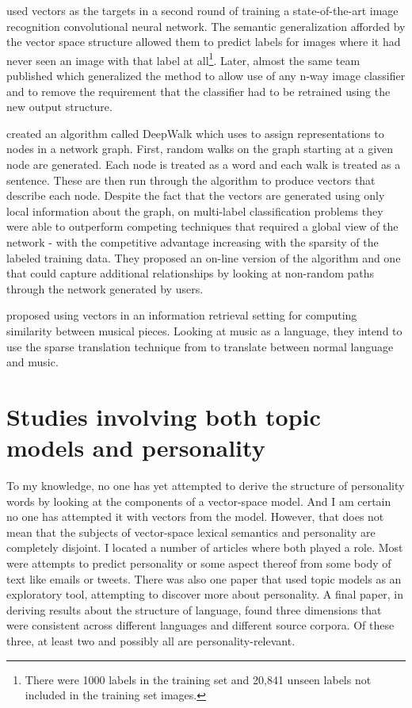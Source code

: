 \citep{Frome2013} used \modelname{} vectors as the targets in a second round
of training a state-of-the-art image recognition convolutional neural network.
The semantic generalization afforded by the vector space structure allowed them
to predict labels for images where it had never seen an image with that label
at all\footnote{There were 1000 labels in the training set and 20,841 unseen 
labels not included in the training set images.}. Later, almost the same team 
published \citep{Norouzi2013} which 
generalized the method to allow use of any n-way image classifier and to 
remove the requirement that the classifier had to be retrained using the 
new output structure. 

\citep{Perozzi2014} created an algorithm called DeepWalk which uses
\modelname{} to assign representations to nodes in a network graph. First, 
random walks on the graph starting at a given node are generated. Each node is
treated as a word and each walk is treated as a sentence. These are then run
through the \modelname{} algorithm to produce vectors that describe each node.
Despite the fact that the vectors are generated using only local information
about the graph, on multi-label classification problems they were able to 
outperform competing techniques that required
a global view of the network - with the competitive advantage increasing with 
the sparsity of the labeled training data. They proposed an on-line version of
the algorithm and one that could capture additional relationships by looking at
non-random paths through the network generated by users.


\citep{Osendorfer2013} proposed using \modelname{} vectors in an information
retrieval setting for computing similarity between musical pieces. Looking at 
music as a language, they intend to use the sparse translation technique from
\citep{Mikolov2013a} to translate between normal language and music.

\section{Studies involving both topic models and personality}

To my knowledge, no one has yet attempted to derive the structure of personality
words by looking at the components of a vector-space model. And 
I am certain no one
has attempted it with vectors from the \modelname{} model. 
However, that does not
mean that the subjects of vector-space lexical semantics and personality are
completely disjoint. I located a number of articles where both played a role.
Most were attempts to predict personality or some aspect thereof from some body 
of text like emails or tweets. There was also one paper that used topic
models as an exploratory tool, attempting to discover more about personality.
A final paper, in deriving results about the structure of language,
found three dimensions that were consistent across different
languages and different source corpora. Of these three, at least two and 
possibly all are personality-relevant.

